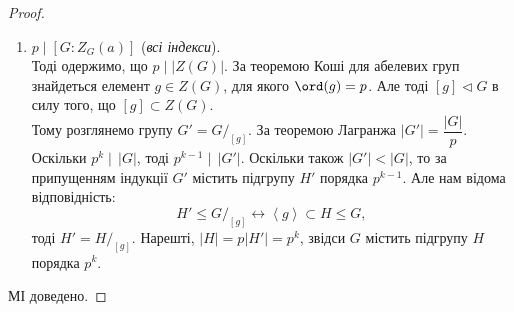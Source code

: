 \documentclass{math_library}
\begin{document}
\begin{proof}
\begin{enumerate}[nosep,wide=0pt,label={\Roman*.}]
\begin{enumerate}[nosep,wide=0pt,label={\roman*)}]
\item $p \mid [G:Z_G(a)]$ (\textit{всі індекси}).\\
Тоді одержимо, що $p \mid |Z(G)|$. За теоремою Коші для абелевих груп знайдеться елемент $g \in Z(G)$, для якого $\ord(g) = p$. Але тоді $[g] \triangleleft G$ в силу того, що $[g] \subset Z(G)$.\\
Тому розглянемо групу $G' = G/_{[g]}$. За теоремою Лагранжа $|G'| = \dfrac{|G|}{p}$. Оскільки $p^k \mid \, |G|$, тоді $p^{k-1} \mid \, |G'|$. Оскільки також $|G'| < |G|$, то за припущенням індукції $G'$ містить підгрупу $H'$ порядка $p^{k-1}$. Але нам відома відповідність:
\[
H' \leq G/_{[g]} \leftrightarrow \left<g\right> \subset H \leq G,
\]
тоді $H' = H/_{[g]}$. Нарешті, $|H| = p |H'| = p^k$, звідси $G$ містить підгрупу $H$ порядка $p^k$.
\end{enumerate}
\end{enumerate}
МІ доведено.

\end{proof}
\end{document}

